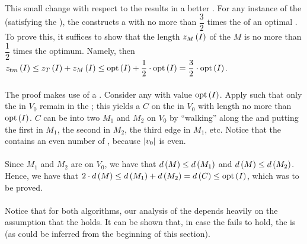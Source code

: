 \paragraph{}
This small change with respect to the  results in a better . For any instance of the  (satisfying the ), the  constructs a  with  no more than $\dfrac{3}{2}$ times the  of an optimal . To prove this, it suffices to show that the length $z_M\left( I \right)$ of the  $M$ is no more than $\dfrac{1}{2}$ times the optimum. Namely, then $z_{tm}\left( I \right)\leq z_T\left( I \right)+z_M\left( I \right)\leq\mbox{opt}\left( I \right)+\dfrac{1}{2}\cdot\mbox{opt}\left( I \right)=\dfrac{3}{2}\cdot\mbox{opt}\left( I \right)$.

\paragraph{}
The proof makes use of a . Consider any  with value $\mbox{opt}\left( I \right)$. Apply  such that only the  in $V_0$ remain in the ; this yields a  $C$ on the  in $V_0$ with length no more than $\mbox{opt}\left( I \right)$. $C$ can be  into two  $M_1$ and $M_2$ on $V_0$ by ``walking'' along the  and putting the first  in $M_1$, the second  in $M_2$, the third edge in
$M_1$, etc. Notice that the  contains an even number of , because $\left| v_0 \right|$ is even.

\paragraph{}
Since $M_1$ and $M_2$ are  on $V_0$, we have that $d\left( M \right)\leq d\left( M_1 \right)$ and $d\left( M \right)\leq d\left( M_2 \right)$. Hence, we have that $2\cdot d\left( M \right)\leq d\left( M_1 \right)+d\left( M_2 \right)=d\left( C \right)\leq\mbox{opt}\left( I \right)$, which was to be proved.

\paragraph{}
Notice that for both algorithms, our analysis of the  depends heavily on the assumption that the  holds. It can be shown that, in case the  fails to hold, the  is  (as could be inferred from the beginning of this section).

